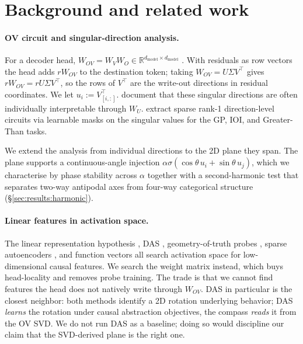 \section{Background and related work}
\label{sec:background}

\paragraph{OV circuit and singular-direction analysis.}
For a decoder head, $W_{OV} = W_V W_O \in \mathbb{R}^{d_{\text{model}}
\times d_{\text{model}}}$ \citep{elhage2021mathematical}. With
residuals as row vectors the head adds $r W_{OV}$ to the
destination token; taking $W_{OV} = U \Sigma V^\top$ gives
$r W_{OV} = r U \Sigma V^\top$, so the rows of $V^\top$ are the
write-out directions in residual coordinates. We let
$u_i := V^\top_{[i,:]}$. \citet{millidge2022svd} document that
these singular directions are often individually interpretable
through $W_U$. \citet{ahmad2025beyond} extract sparse rank-1
direction-level circuits via learnable masks on the singular
values for the GP, IOI, and Greater-Than tasks.

We extend the analysis from individual directions to the 2D plane
they span. The plane supports a continuous-angle injection
$\alpha\sigma(\cos\theta\, u_i + \sin\theta\, u_j)$, which we
characterise by phase stability across $\alpha$ together with a
second-harmonic test that separates two-way antipodal axes from
four-way categorical structure (\S\ref{sec:results:harmonic}).

\paragraph{Linear features in activation space.}
The linear representation hypothesis \citep{park2024linearrep}, DAS
\citep{geiger2024das}, geometry-of-truth probes
\citep{marks2024geometry}, sparse autoencoders
\citep{cunningham2023sparse,templeton2024scaling}, and function
vectors \citep{todd2024function} all search activation space for
low-dimensional causal features. We search the weight matrix
instead, which buys head-locality and removes probe training. The
trade is that we cannot find features the head does not natively
write through $W_{OV}$. DAS in particular is the closest neighbor:
both methods identify a 2D rotation underlying behavior; DAS
\emph{learns} the rotation under causal abstraction objectives, the
compass \emph{reads} it from the OV SVD. We do not run DAS as a
baseline; doing so would discipline our claim that the SVD-derived
plane is the right one.

